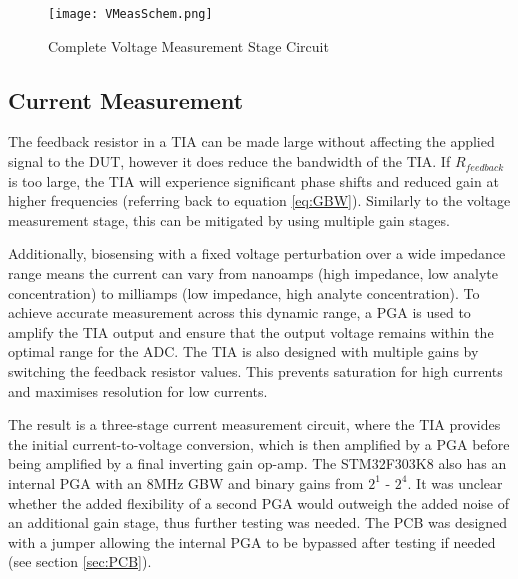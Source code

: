 \begin{figure}[H]
    \centering
    \texttt{[image: VMeasSchem.png]}
    \caption{Complete Voltage Measurement Stage Circuit}
    \label{fig:vmeas_stage_circuit}
\end{figure}

\subsection{Current Measurement}\label{subsec:design_cur}
The feedback resistor in a \ac{TIA} can be made large without affecting the applied signal to the \ac{DUT}, however it does reduce the bandwidth of the TIA. If $R_{feedback}$ is too large, the TIA will experience significant phase shifts and reduced gain at higher frequencies (referring back to equation \ref{eq:GBW}). Similarly to the voltage measurement stage, this can be mitigated by using multiple gain stages.

Additionally, biosensing with a fixed voltage perturbation over a wide impedance range means the current can vary from nanoamps (high impedance, low analyte concentration) to milliamps (low impedance, high analyte concentration). To achieve accurate measurement across this dynamic range, a \ac{PGA} is used to amplify the TIA output and ensure that the output voltage remains within the optimal range for the \ac{ADC}. The TIA is also designed with multiple gains by switching the feedback resistor values. This prevents saturation for high currents and maximises resolution for low currents. 

The result is a three-stage current measurement circuit, where the TIA provides the initial current-to-voltage conversion, which is then amplified by a \ac{PGA} before being amplified by a final inverting gain op-amp. The STM32F303K8 also has an internal PGA with an 8MHz GBW and binary gains from $2^1$ - $2^4$. It was unclear whether the added flexibility of a second PGA would outweigh the added noise of an additional gain stage, thus further testing was needed. The PCB was designed with a jumper allowing the internal PGA to be bypassed after testing if needed (see section \ref{sec:PCB}).
